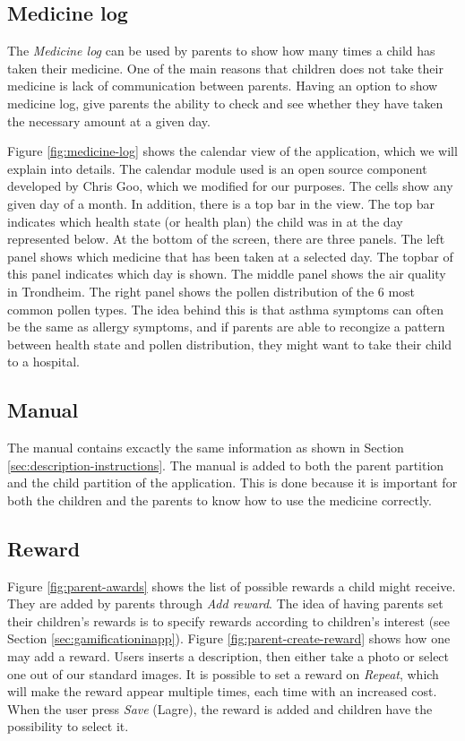 \subsection{Medicine log}
\label{sec:description-medicine-log}
The \emph{Medicine log} can be used by parents to show how many times a child has taken their medicine. One of the main reasons that children does not take their medicine is lack of communication between parents. Having an option to show medicine log, give parents the ability to check and see whether they have taken the necessary amount at a given day.


Figure \ref{fig:medicine-log} shows the calendar view of the application, which we will explain into details. The calendar module used is an open source component developed by Chris Goo, which we modified for our purposes. The cells show any given day of a month. In addition, there is a top bar in the view. The top bar indicates which health state (or health plan) the child was in at the day represented below. At the bottom of the screen, there are three panels. The left panel shows which medicine that has been taken at a selected day. The topbar of this panel indicates which day is shown. The middle panel shows the air quality in Trondheim. The right panel shows the pollen distribution of the 6 most common pollen types. The idea behind this is that asthma symptoms can often be the same as allergy symptoms, and if parents are able to recongize a pattern between health state and pollen distribution, they might want to take their child to a hospital.    


\subsection{Manual}
\label{sec:description-manual}
The manual contains excactly the same information as shown in Section \ref{sec:description-instructions}. The manual is added to both the parent partition and the child partition of the application. This is done because it is important for both the children and the parents to know how to use the medicine correctly. 


\subsection{Reward}
\label{sec:description-manage-rewards}
Figure \ref{fig:parent-awards} shows the list of possible rewards a child might receive. They are added by parents through \emph{Add reward}. The idea of having parents set their children's rewards is to specify rewards according to children's interest (see Section \ref{sec:gamificationinapp}). Figure \ref{fig:parent-create-reward} shows how one may add a reward. Users inserts a description, then either take a photo or select one out of our standard images. It is possible to set a reward on \emph{Repeat}, which will make the reward appear multiple times, each time with an increased cost.        
When the user press \emph{Save} (Lagre), the reward is added and children have the possibility to select it. 
 
